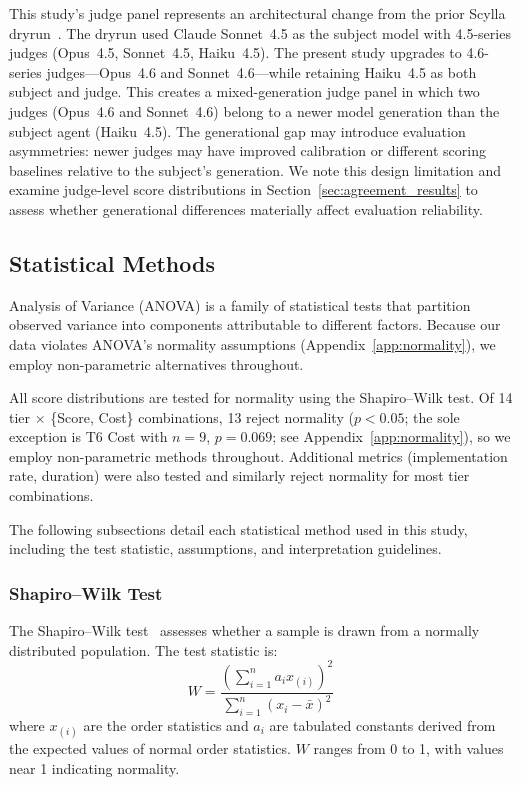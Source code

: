 \documentclass[11pt]{article}
\begin{document}
This study's judge panel represents an architectural change from the prior
Scylla dryrun~\cite{scylla2026dryrun}. The dryrun used Claude Sonnet~4.5 as
the subject model with 4.5-series judges (Opus~4.5, Sonnet~4.5, Haiku~4.5).
The present study upgrades to 4.6-series judges---Opus~4.6 and
Sonnet~4.6---while retaining Haiku~4.5 as both subject and judge. This creates
a mixed-generation judge panel in which two judges (Opus~4.6 and Sonnet~4.6)
belong to a newer model generation than the subject agent (Haiku~4.5). The
generational gap may introduce evaluation asymmetries: newer judges may have
improved calibration or different scoring baselines relative to the subject's
generation. We note this design limitation and examine judge-level score
distributions in Section~\ref{sec:agreement_results} to assess whether
generational differences materially affect evaluation reliability.

\subsection{Statistical Methods}
\label{sec:statistical_methods}

Analysis of Variance (ANOVA) is a family of statistical tests that partition
observed variance into components attributable to different factors. Because our
data violates ANOVA's normality assumptions (Appendix~\ref{app:normality}), we
employ non-parametric alternatives throughout.

All score distributions are tested for normality using the Shapiro--Wilk test.
Of 14 tier $\times$ \{Score, Cost\} combinations, 13 reject normality
($p < 0.05$; the sole exception is T6 Cost with $n=9$, $p=0.069$; see
Appendix~\ref{app:normality}), so we employ non-parametric methods
throughout. Additional metrics (implementation rate, duration) were also
tested and similarly reject normality for most tier combinations.

The following subsections detail each statistical method used in this study,
including the test statistic, assumptions, and interpretation guidelines.

\subsubsection{Shapiro--Wilk Test}
\label{sec:shapiro_wilk}

The Shapiro--Wilk test~\cite{shapiro1965analysis} assesses whether a sample is
drawn from a normally distributed population. The test statistic is:
\begin{equation}
  W = \frac{\left(\sum_{i=1}^{n} a_i x_{(i)}\right)^2}{\sum_{i=1}^{n}(x_i - \bar{x})^2}
\end{equation}
where $x_{(i)}$ are the order statistics and $a_i$ are tabulated constants
derived from the expected values of normal order statistics. $W$ ranges from
0 to 1, with values near 1 indicating normality.
\end{document}
